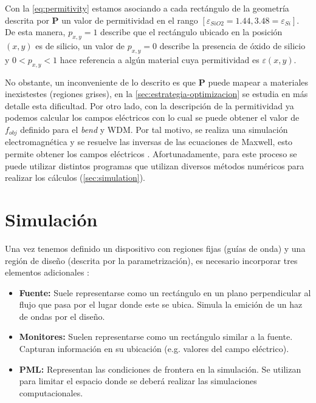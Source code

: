 Con la \autoref{eq:permitivity} estamos asociando a cada rectángulo de la geometría descrita por
$\boldsymbol{P}$ un valor de permitividad en el rango 
$[\varepsilon_{SiO2} = 1.44, 3.48 = \varepsilon_{Si}]$.
De esta manera, $p_{x, y} = 1$ describe que el rectángulo ubicado en la posición $(x, y)$ es de silicio,
un valor de $p_{x, y} = 0$ describe la presencia de óxido de silicio y $0 < p_{x, y} < 1$ hace referencia
a algún material cuya permitividad es $\varepsilon(x, y)$.

No obstante, un inconveniente de lo descrito es que $\boldsymbol{P}$ puede mapear a materiales inexistestes
(regiones grises),
en la \autoref{sec:estrategia-optimizacion} se estudia en más detalle esta dificultad.
Por otro lado, con la descripción de la permitividad ya podemos calcular los campos eléctricos con lo
cual se puede obtener el valor de $f_{obj}$ definido para el \emph{bend} y WDM.
Por tal motivo, se realiza una simulación electromagnética y se resuelve las inversas de las 
ecuaciones de Maxwell, esto permite obtener los campos eléctricos \citep{Su2020}.
Afortunadamente, para este proceso se puede utilizar distintos programas que utilizan diversos 
métodos numéricos para realizar los cálculos (\autoref{sec:simulation}).

\section{Simulación}\label{sec:simulation}

Una vez tenemos definido un dispositivo con regiones fijas (guías de onda) y una
región de diseño (descrita por la parametrización), es necesario incorporar
tres elementos adicionales \citep{Oskooi2010, Su2020}:

\begin{itemize}

  \item \textbf{Fuente:} Suele representarse como un rectángulo en un plano perpendicular al flujo
    que pasa por el lugar donde este se ubica. Simula la emición de un haz de ondas por el diseño.

  \item \textbf{Monitores:} Suelen representarse como un rectángulo similar a la fuente.
    Capturan información en su ubicación (e.g. valores del campo eléctrico).

  \item \textbf{PML:} Representan las condiciones de frontera en la simulación. 
    Se utilizan para limitar el espacio donde se deberá realizar las simulaciones computacionales.

\end{itemize}

